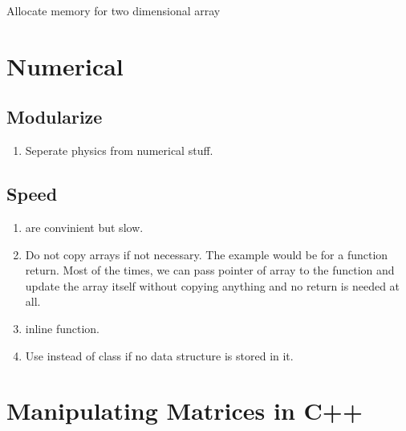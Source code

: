 \documentclass[letterpaper,12pt,english]{sphinxmanual}
\begin{document}
Allocate memory for two dimensional array

\begin{sphinxVerbatim}[commandchars=\\\{\}]
 \PYG{p}{[}\PYG{p}{]}   \PYG{p}{[}\PYG{p}{]}\PYG{p}{[}\PYG{p}{]}
\end{sphinxVerbatim}


\section{Numerical}
\label{\detokenize{cpp/numerical::doc}}\label{\detokenize{cpp/numerical:numerical}}

\subsection{Modularize}
\label{\detokenize{cpp/numerical:modularize}}\begin{enumerate}
\item {} 
Seperate physics from numerical stuff.

\end{enumerate}


\subsection{Speed}
\label{\detokenize{cpp/numerical:speed}}\begin{enumerate}
\item {} 
 are convinient but slow. 

\item {} 
Do not copy arrays if not necessary. The example would be for a function return. Most of the times, we can pass pointer of array to the function and update the array itself without copying anything and no return is needed at all.

\item {} 
inline function.

\item {} 
Use  instead of class if no data structure is stored in it.

\end{enumerate}


\section{Manipulating Matrices in C++}
\label{\detokenize{cpp/manipulating-matrices::doc}}\label{\detokenize{cpp/manipulating-matrices:manipulating-matrices-in-c}}
\end{document}
